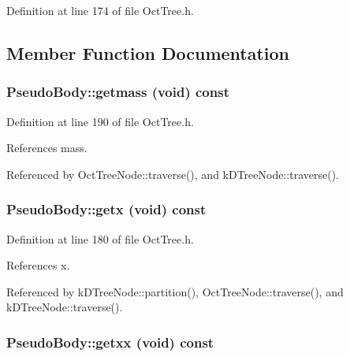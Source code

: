 Definition at line 174 of file OctTree.h.



\subsection{Member Function Documentation}
\subsubsection[{getmass}]{ PseudoBody::getmass (void) const}\label{classPseudoBody_ace7f2a17a0d75e2bf822cd5223d997fe}


Definition at line 190 of file OctTree.h.



References mass.



Referenced by OctTreeNode::traverse(), and kDTreeNode::traverse().

\subsubsection[{getx}]{ PseudoBody::getx (void) const}\label{classPseudoBody_a323d87fa3063a25ba8858f5bc024dc4e}


Definition at line 180 of file OctTree.h.



References x.



Referenced by kDTreeNode::partition(), OctTreeNode::traverse(), and kDTreeNode::traverse().

\subsubsection[{getxx}]{ PseudoBody::getxx (void) const}\label{classPseudoBody_adea161238936ce49799d5f7f44676b03}


